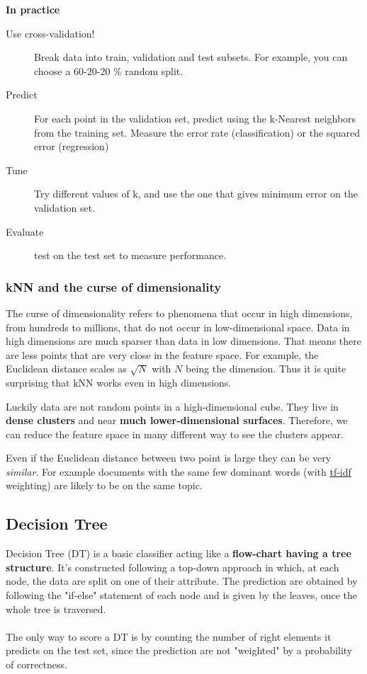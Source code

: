 \textbf{In practice}
\\
\begin{description}
 \item[Use cross-validation!] Break data into train, validation and test subsets. For example, you can choose a 60-20-20 \% random split.
 \item[Predict] For each point in the validation set, predict using the k-Nearest neighbors from the training set. Measure the error rate (classification) or the squared error (regression)
 \item[Tune] Try different values of k, and use the one that gives minimum error on the validation set.
 \item[Evaluate] test on the test set to measure performance.
\end{description}

\subsubsection{kNN and the curse of dimensionality}

The curse of dimensionality refers to phenomena that occur in high dimensions, from hundreds to millions, that do not occur in low-dimensional space. Data in high dimensions are much sparser than data in low dimensions. That means there are less points that are very close in the feature space. For example, the Euclidean distance scales as $\sqrt{N}$ with $N$ being the dimension. Thus it is quite surprising that kNN works even in high dimensions. 

Luckily data are not random points in a high-dimensional cube. They live in {\bf dense clusters} and near {\bf much lower-dimensional surfaces}. Therefore, we can reduce the feature space in many different way to see the clusters appear.

Even if the Euclidean distance between two point is large they can be very \emph{similar}. For example documents with the same few dominant words (with \href{https://en.wikipedia.org/wiki/Tf-idf}{tf-idf} weighting) are likely to be on the same topic.

\subsection{Decision Tree}

Decision Tree (DT) is a basic classifier acting like a \textbf{flow-chart having a tree structure}. It's constructed following a top-down approach in which, at each node, the data are split on one of their attribute. The prediction are obtained by following the "if-else" statement of each node and is given by the leaves, once the whole tree is traversed.
\\\\
The only way to score a DT is by counting the number of right elements it predicts on the test set, since the prediction are not "weighted" by a probability of correctness.

